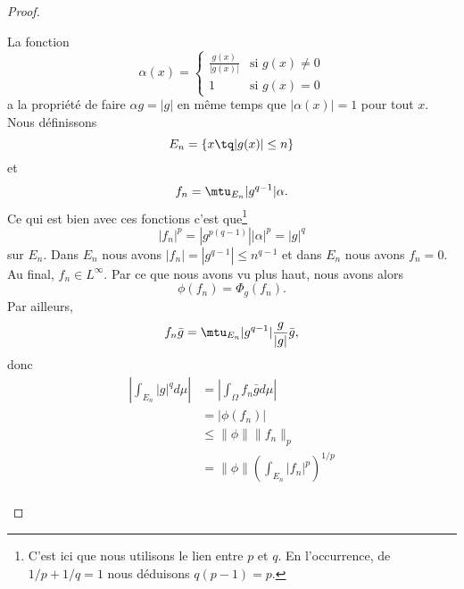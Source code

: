 \begin{proof}
\begin{subproof}
		La fonction
		\begin{equation}
			\alpha(x)=\begin{cases}
				\frac{ g(x) }{ | g(x) | } & \text{si } g(x)\neq 0 \\
				1                         & \text{si } g(x)=0
			\end{cases}
		\end{equation}
		a la propriété de faire \( \alpha g=| g |\) en même temps que \( | \alpha(x) |=1\) pour tout \( x\). Nous définissons
		\begin{equation}
			E_n=\{ x\tq | g(x) |\leq n \}
		\end{equation}
		et
		\begin{equation}
			f_n=\mtu_{E_n}| g^{q-1} |\alpha.
		\end{equation}
		Ce qui est bien avec ces fonctions c'est que\footnote{C'est ici que nous utilisons le lien entre \( p\) et \( q\). En l'occurrence, de \( 1/p+1/q=1\) nous déduisons \( q(p-1)=p\).}
		\begin{equation}
			| f_n |^p=| g^{p(q-1)} || \alpha |^p=| g |^q
		\end{equation}
		sur \( E_n\). Dans \( E_n\) nous avons \( | f_n |=| g^{q-1} |\leq n^{q-1}\) et dans \( E_n\) nous avons \( f_n=0\). Au final, \( f_n\in L^{\infty}\). Par ce que nous avons vu plus haut, nous avons alors
		\begin{equation}
			\phi(f_n)=\Phi_g(f_n).
		\end{equation}
		Par ailleurs,
		\begin{equation}
			f_n\bar g=\mtu_{E_n}| g^{q-1} |\frac{ g }{ | g | }\bar g,
		\end{equation}
		donc
		\begin{subequations}
			\begin{align}
				\left|\int_{E_n}| g |^qd\mu\right| & =|\int_{\Omega}f_n\bar gd\mu|                       \\
				                                   & =|\phi(f_n)|                                        \\
				                                   & \leq \| \phi \|\| f_n \|_p                          \\
				                                   & =\| \phi \|\left( \int_{E_n}| f_n |^p \right)^{1/p} \\

\end{align}
\end{subequations}
\end{subproof}
\end{proof}
